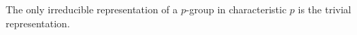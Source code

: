 The only irreducible representation of a $p$-group in characteristic $p$ is the trivial representation.
